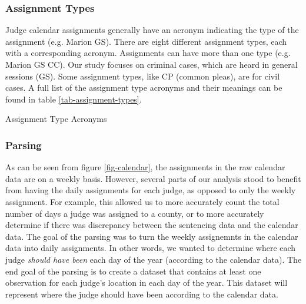 \documentclass[11pt]{article}
\theoremstyle{ModifiedStyle}
\begin{document}
    \subsubsection{Assignment Types}
      Judge calendar assignments generally have an acronym indicating the type of the assignment (e.g. Marion GS). There are eight different assignment types, each with a corresponding acronym. Assignments can have more than one type (e.g. Marion GS CC). Our study focuses on criminal cases, which are heard in general sessions (GS). Some assignment types, like CP (common pleas), are for civil cases. A full list of the assignment type acronyms and their meanings can be found in table \ref{tab-assignment-types}.

      \begin{table}[H]
        \centering
        \caption{Assignment Type Acronyms}
        \label{tab-assignment-types}
        
      \end{table}

    \subsubsection{Parsing}
      As can be seen from figure \ref{fig-calendar}, the assignments in the raw calendar data are on a weekly basis. However, several parts of our analysis stood to benefit from having the daily assignments for each judge, as opposed to only the weekly assignment. For example, this allowed us to more accurately count the total number of days a judge was assigned to a county, or to more accurately determine if there was discrepancy between the sentencing data and the calendar data. The goal of the parsing was to turn the weekly assignemnts in the calendar data into daily assignments. In other words, we wanted to determine where each judge \textit{should have been} each day of the year (according to the calendar data). The end goal of the parsing is to create a dataset that contains at least one observation for each judge's location in each day of the year. This dataset will represent where the judge should have been according to the calendar data.
\end{document}
